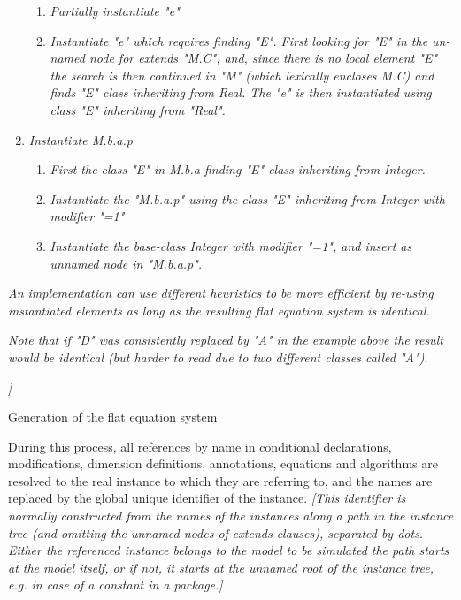 \begin{enumerate}
  \begin{enumerate}
  \item
    \emph{Partially instantiate "e"}
  \item
    \emph{Instantiate "e" which requires finding "E". First looking for
    "E" in the un-named node for extends "M.C", and, since there is no
    local element "E" the search is then continued in "M" (which
    lexically encloses M.C) and finds "E" class inheriting from Real.
    The "e" is then instantiated using class "E" inheriting from
    "Real".}
  \end{enumerate}
\item
  \emph{Instantiate M.b.a.p}

  \begin{enumerate}
  \item
    \emph{First the class "E" in M.b.a finding "E" class inheriting from
    Integer.}
  \item
    \emph{Instantiate the "M.b.a.p" using the class "E" inheriting from
    Integer with modifier "=1"}
  \item
    \emph{Instantiate the base-class Integer with modifier "=1", and
    insert as unnamed node in "M.b.a.p".}
  \end{enumerate}
\end{enumerate}

\emph{An implementation can use different heuristics to be more
efficient by re-using instantiated elements as long as the resulting
flat equation system is identical. }

\emph{Note that if "D" was consistently replaced by "A" in the example
above the result would be identical (but harder to read due to two
different classes called "A"). }

\emph{{]}}

Generation of the flat equation system

During this process, all references by name in conditional declarations,
modifications, dimension definitions, annotations, equations and
algorithms are resolved to the real instance to which they are referring
to, and the names are replaced by the global unique identifier of the
instance. \emph{{[}This identifier is normally constructed from the
names of the instances along a path in the instance tree (and omitting
the unnamed nodes of extends clauses), separated by dots. Either the
referenced instance belongs to the model to be simulated the path starts
at the model itself, or if not, it starts at the unnamed root of the
instance tree, e.g. in case of a constant in a package.{]}}

